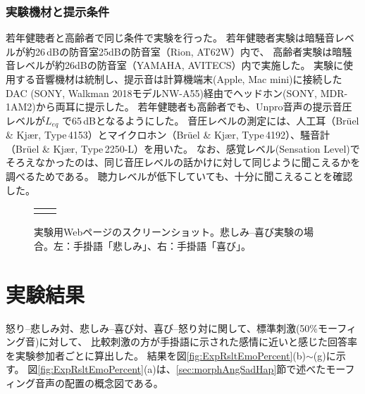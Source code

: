 \subsubsection{実験機材と提示条件}
若年健聴者と高齢者で同じ条件で実験を行った。
若年健聴者実験は暗騒音レベルが約26\,dBの防音室25dBの防音室（Rion, AT62W）内で、
高齢者実験は暗騒音レベルが約26dBの防音室（YAMAHA, AVITECS）内で実施した。
実験に使用する音響機材は統制し、提示音は計算機端末(Apple, Mac mini)に接続したDAC (SONY, Walkman 2018モデルNW-A55)経由でヘッドホン(SONY, MDR-1AM2)から両耳に提示した。
若年健聴者も高齢者でも、Unpro音声の提示音圧レベルが${L_{eq}}$ で65\,dBとなるようにした。
音圧レベルの測定には、人工耳（Br\"{u}el \& Kj\ae r, Type\,4153）とマイクロホン（Br\"{u}el \& Kj\ae r, Type\,4192）、騒音計（Br\"{u}el \& Kj\ae r, Type\,2250-L）を用いた。
なお、感覚レベル(Sensation Level)でそろえなかったのは、同じ音圧レベルの話かけに対して同じように聞こえるかを調べるためである。
聴力レベルが低下していても、十分に聞こえることを確認した。



\begin{figure}[h]
  \vspace{10pt}
  \begin{tabular}{cc}
  \begin{minipage} {0.47\hsize}
  \centering
  \includegraphics [ width = 1\columnwidth]{Figure/ExpAngHapSad/FigWeb_sad.eps}
  \end{minipage} & 
  
  \begin{minipage} {0.47\hsize}
  \centering
  \includegraphics [ width = 1\columnwidth]{Figure/ExpAngHapSad/FigWeb_hap.eps }
  \end{minipage}
  
  \end{tabular}
  
  \caption{実験用Webページのスクリーンショット。悲しみ--喜び実験の場合。左：手掛語「悲しみ」、右：手掛語「喜び」。
            }
  \label{fig:Expweb} 

\end{figure}


\newpage
\section{実験結果}
\label{sec:ResultAngSadHap}
怒り--悲しみ対、悲しみ--喜び対、喜び--怒り対に関して、標準刺激(50\%モーフィング音)に対して、
比較刺激の方が手掛語に示された感情に近いと感じた回答率を実験参加者ごとに算出した。
結果を図\ref{fig:ExpRsltEmoPercent}(b)$\sim$(g)に示す。
図\ref{fig:ExpRsltEmoPercent}(a)は、\ref{sec:morphAngSadHap}節で述べたモーフィング音声の配置の概念図である。


